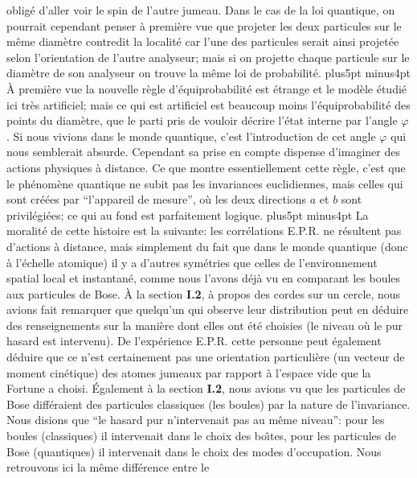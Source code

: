 oblig\'e d'aller voir le spin de l'autre jumeau. Dans le cas de la loi 
quantique, on pourrait cependant penser \`a  premi\`ere vue que projeter 
les deux particules sur le m\^eme diam\`etre  contredit la localit\'e car 
l'une des particules serait ainsi projet\'ee selon l'orientation de l'autre 
analyseur; mais si  on projette chaque particule sur le diam\`etre de son 
analyseur on trouve la m\^eme  loi de  probabilit\'e.  
\vskip6pt plus5pt minus4pt 
\`A  premi\`ere vue la nouvelle r\`egle d'\'equiprobabilit\'e est 
\'etrange  et le mod\`ele \'etudi\'e ici tr\`es artificiel;  mais ce qui est 
artificiel est beaucoup moins  l'\'equiprobabilit\'e des  points  du
diam\`etre, que le parti pris de vouloir d\'ecrire l'\'etat interne par 
l'angle $\varphi$. Si nous vivions dans le monde quantique, c'est
l'introduction de cet angle $\varphi$ qui nous semblerait absurde.
Cependant sa prise en compte dispense d'imaginer des actions physiques
\`a  distance. Ce que montre essentiellement cette r\`egle, c'est que le
ph\'enom\`ene quantique ne subit pas les invariances euclidiennes, mais
celles qui sont cr\'e\'ees par ``l'appareil de mesure'', o\`u les deux
directions $a$ et $b$ sont privil\'egi\'ees; ce qui au fond est 
parfaitement logique.
\vskip6pt plus5pt minus4pt 
La moralit\'e de cette histoire est la suivante: les corr\'elations E.P.R.  
ne r\'esultent pas d'actions \`a distance, mais simplement du fait que 
dans le monde quantique (donc \`a l'\'echelle atomique) il y a d'autres 
sym\'etries que celles de l'environnement spatial local et instantan\'e,
comme nous l'avons d\'ej\`a vu en comparant les boules aux particules 
de Bose. \`A  la  section {\bf I.2}, \`a propos des cordes sur un cercle,
 nous avions fait remarquer que quelqu'un qui observe leur distribution
peut en d\'eduire des  renseignements sur la mani\`ere dont elles ont
\'et\'e choisies (le niveau o\`u le pur hasard est intervenu). De
l'exp\'erience E.P.R. cette personne peut \'egalement d\'eduire que ce
n'est certainement pas une orientation particuli\`ere (un vecteur de
moment cin\'etique) des atomes jumeaux par rapport  \`a l'espace vide
que la Fortune a choisi. \'Egalement \`a la section  {\bf I.2}, nous avions
vu que les particules de Bose diff\'eraient  des particules classiques (les
boules) par la nature de l'invariance. Nous disions 
que  ``le hasard pur n'intervenait pas au m\^eme niveau'': pour les boules 
(classiques) il intervenait dans le choix des bo\^\i tes, pour les 
particules de Bose (quantiques) il intervenait dans le choix des modes 
d'occupation. Nous retrouvons ici la m\^eme diff\'erence entre le 
